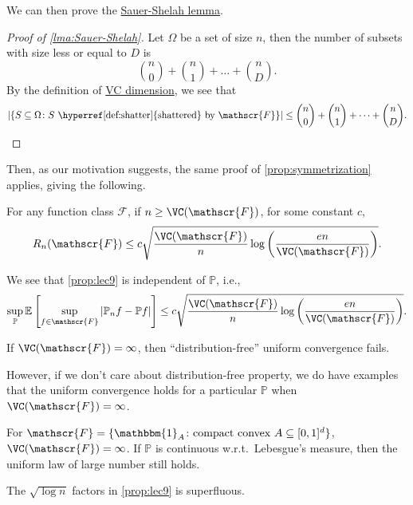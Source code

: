 We can then prove the \hyperref[lma:Sauer-Shelah]{Sauer-Shelah lemma}.

\begin{proof}[Proof of \autoref{lma:Sauer-Shelah}]
	Let \(\Omega \) be a set of size \(n\), then the number of subsets with size less or equal to \(D\) is
	\[
		\binom{n}{0} + \binom{n}{1} + \dots + \binom{n}{D}.
	\]
	By the definition of \hyperref[def:VC-dimension]{VC dimension}, we see that
	\[
		\vert \{ S \subseteq \Omega \colon S \text{ \hyperref[def:shatter]{shattered} by } \mathscr{F} \} \vert
		\leq \binom{n}{0} + \binom{n}{1} + \dots + \binom{n}{D}.
	\]
\end{proof}

Then, as our motivation suggests, the same proof of \autoref{prop:symmetrization} applies, giving the following.

\begin{proposition}\label{prop:lec9}
	For any function class \(\mathscr{F} \), if \(n \geq \VC(\mathscr{F} ) \), for some constant \(c\),
	\[
		R_n(\mathscr{F} ) \leq c \sqrt{\frac{\VC(\mathscr{F} ) }{n} \log \left( \frac{en}{\VC(\mathscr{F} ) } \right) }.
	\]
\end{proposition}

\begin{remark}
	We see that \autoref{prop:lec9} is independent of \(\mathbb{P} \), i.e.,
	\[
		\sup _{\mathbb{P} } \mathbb{E}_{}\left[\sup _{f\in \mathscr{F} } \vert \mathbb{P} _n f - \mathbb{P} f \vert \right] \leq c \sqrt{\frac{\VC(\mathscr{F} )}{n} \log \left( \frac{en}{\VC(\mathscr{F} )} \right) } .
	\]
\end{remark}

\begin{remark}
	If \(\VC(\mathscr{F} ) = \infty \), then ``distribution-free'' uniform convergence fails.
\end{remark}

However, if we don't care about distribution-free property, we do have examples that the uniform convergence holds for a particular \(\mathbb{P} \) when \(\VC(\mathscr{F} ) = \infty \).

\begin{eg}
	For \(\mathscr{F} = \{ \mathbbm{1}_{A} \colon \text{compact convex } A \subseteq [0, 1]^d \} \), \(\VC(\mathscr{F} ) = \infty \). If \(\mathbb{P} \) is continuous w.r.t.\ Lebesgue's measure, then the uniform law of large number still holds.
\end{eg}

\begin{remark}\label{rmk:log-n-superfluous}
	The \(\sqrt{\log n} \) factors in \autoref{prop:lec9} is superfluous.
\end{remark}

